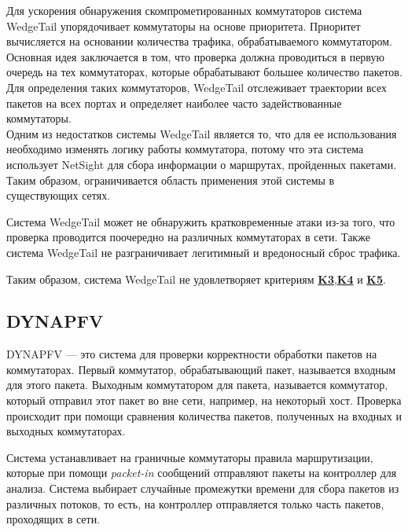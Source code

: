 \documentclass[../thesis.tex]{subfiles}
\begin{document}
Для ускорения обнаружения скомпрометированных коммутаторов система WedgeTail упорядочивает коммутаторы на основе приоритета.
Приоритет вычисляется на основании количества трафика, обрабатываемого коммутатором.
Основная идея заключается в том, что проверка должна проводиться в первую очередь на тех коммутаторах, которые обрабатывают большее количество пакетов.
Для определения таких коммутаторов, WedgeTail отслеживает траектории всех пакетов на всех портах и определяет наиболее часто задействованные коммутаторы.
\\

Одним из недостатков системы WedgeTail является то, что для ее использования необходимо изменять логику работы коммутатора, потому что эта система использует NetSight для сбора информации о маршрутах, пройденных пакетами.
Таким образом, ограничивается область применения этой системы в существующих сетях.

Система WedgeTail может не обнаружить кратковременные атаки из-за того, что проверка проводится поочередно на различных коммутаторах в сети.
Также система WedgeTail не разграничивает легитимный и вредоносный сброс трафика.

{
\hypersetup{linkcolor=black}

Таким образом, система WedgeTail не удовлетворяет критериям \hyperref[criterion:K3]{\textbf{K3}},\linebreak \hyperref[criterion:K4]{\textbf{K4}} и \hyperref[criterion:K5]{\textbf{K5}}.
}

\subsection{DYNAPFV} \label{subsection:dynapfv}

DYNAPFV \cite{li2018dynamic} --- это система для проверки корректности обработки пакетов на коммутаторах.
Первый коммутатор, обрабатывающий пакет, называется входным для этого пакета.
Выходным коммутатором для пакета, называется коммутатор, который отправил этот пакет во вне сети, например, на некоторый хост. 
Проверка происходит при помощи сравнения количества пакетов, полученных на входных и выходных коммутаторах.

Система устанавливает на граничные коммутаторы правила маршрутизации, которые при помощи \textit{packet-in} сообщений \cite{openflow15} отправляют пакеты на контроллер для анализа.
Система выбирает случайные промежутки времени для сбора пакетов из различных потоков, то есть, на контроллер отправляется только часть пакетов, проходящих в сети.
\end{document}
